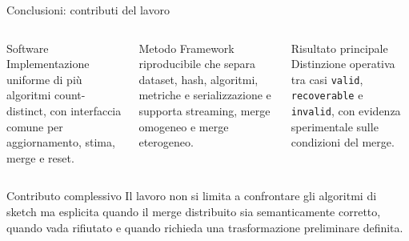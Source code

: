 \documentclass[aspectratio=169,11pt]{beamer}
\begin{document}
\begin{frame}{Conclusioni: contributi del lavoro}
  \begin{columns}[T,onlytextwidth]
      \begin{block}{Software}
        \footnotesize
        Implementazione uniforme di pi\`u algoritmi count-distinct, con
        interfaccia comune per aggiornamento, stima, merge e reset.
      \end{block}
      \begin{block}{Metodo}
        \footnotesize
        Framework riproducibile che separa dataset, hash, algoritmi, metriche e
        serializzazione e supporta streaming, merge omogeneo e merge eterogeneo.
      \end{block}
      \begin{block}{Risultato principale}
        \footnotesize
        Distinzione operativa tra casi \texttt{valid}, \texttt{recoverable} e
        \texttt{invalid}, con evidenza sperimentale sulle condizioni del merge.
      \end{block}
  \end{columns}

  \vspace{0.12cm}

  \begin{block}{Contributo complessivo}
    \footnotesize
    Il lavoro non si limita a confrontare gli algoritmi di sketch ma esplicita quando il merge
    distribuito sia semanticamente corretto, quando vada rifiutato e quando
    richieda una trasformazione preliminare definita.
  \end{block}
\end{frame}
\end{document}
